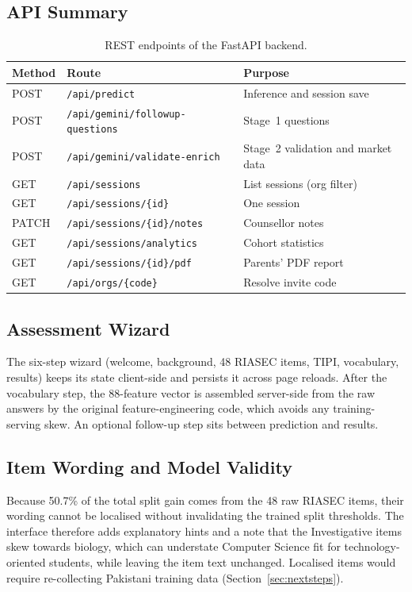 \subsection{API Summary}
\begin{table}[h]
\centering
\small
\caption{REST endpoints of the FastAPI backend.}
\label{tab:api}
\begin{tabular}{lll}
\toprule
\textbf{Method} & \textbf{Route} & \textbf{Purpose} \\
\midrule
POST  & \texttt{/api/predict}                   & Inference and session save \\
POST  & \texttt{/api/gemini/followup-questions} & Stage~1 questions \\
POST  & \texttt{/api/gemini/validate-enrich}    & Stage~2 validation and market data \\
GET   & \texttt{/api/sessions}                  & List sessions (org filter) \\
GET   & \texttt{/api/sessions/\{id\}}           & One session \\
PATCH & \texttt{/api/sessions/\{id\}/notes}     & Counsellor notes \\
GET   & \texttt{/api/sessions/analytics}        & Cohort statistics \\
GET   & \texttt{/api/sessions/\{id\}/pdf}       & Parents' PDF report \\
GET   & \texttt{/api/orgs/\{code\}}             & Resolve invite code \\
\bottomrule
\end{tabular}
\end{table}

\subsection{Assessment Wizard}
The six-step wizard (welcome, background, 48 RIASEC items, TIPI, vocabulary,
results) keeps its state client-side and persists it across page reloads.
After the vocabulary step, the 88-feature vector is assembled server-side
from the raw answers by the original feature-engineering code, which avoids
any training-serving skew. An optional follow-up step sits between
prediction and results.

\subsection{Item Wording and Model Validity}
Because 50.7\% of the total split gain comes from the 48 raw RIASEC items,
their wording cannot be localised without invalidating the trained split
thresholds. The interface therefore adds explanatory hints and a note that
the Investigative items skew towards biology, which can understate
Computer Science fit for technology-oriented students, while leaving the item
text unchanged. Localised items would require re-collecting Pakistani
training data (Section~\ref{sec:nextsteps}).
